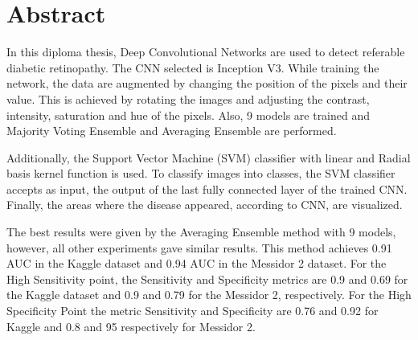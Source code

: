 \pagestyle{plain}
\chapter*{Abstract}

In this diploma thesis, Deep Convolutional Networks are used to detect referable diabetic retinopathy. The CNN selected is Inception V3. While training the network, the data are augmented by changing the position of the pixels and their value. This is achieved by rotating the images and adjusting the contrast, intensity, saturation and hue of the pixels. Also, 9 models are trained and Majority Voting Ensemble  and Averaging Ensemble are performed.


Additionally, the Support Vector Machine (SVM) classifier with linear and Radial basis kernel function is used. To classify images into classes, the SVM classifier accepts as input, the output of the last fully connected layer of the trained CNN. Finally, the areas where the disease  appeared, according to CNN, are visualized.


The best results were given by the Averaging Ensemble method with 9 models, however, all other experiments gave similar results. This method achieves 0.91 AUC in the Kaggle dataset and 0.94 AUC in the Messidor 2 dataset. For the High Sensitivity point, the Sensitivity and Specificity metrics are 0.9 and 0.69 for the Kaggle dataset and 0.9 and 0.79 for the Messidor 2, respectively. For the High Specificity Point the metric Sensitivity and Specificity are 0.76 and 0.92 for Kaggle and 0.8 and 95 respectively for Messidor 2.


